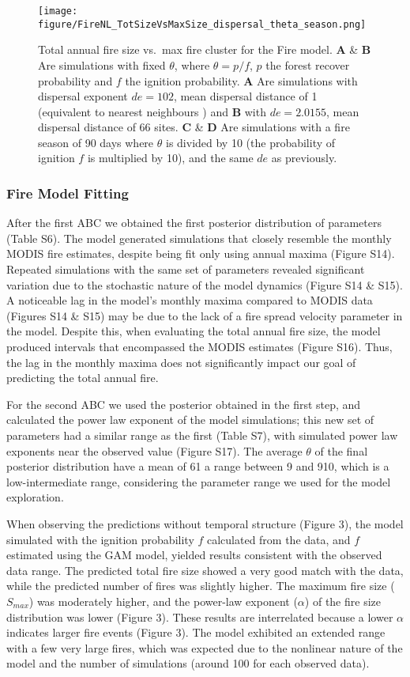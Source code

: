 \documentclass[
]{article}
\begin{document}
\begin{figure}
\centering
\texttt{[image: figure/FireNL\_TotSizeVsMaxSize\_dispersal\_theta\_season.png]}
\caption{Total annual fire size vs.~max fire cluster for the Fire model.
\textbf{A} \& \textbf{B} Are simulations with fixed \(\theta\), where
\(\theta = p/f\), \(p\) the forest recover probability and \(f\) the
ignition probability. \textbf{A} Are simulations with dispersal exponent
\(de=102\), mean dispersal distance of 1 (equivalent to nearest
neighbours ) and \textbf{B} with \(de=2.0155\), mean dispersal distance
of 66 sites. \textbf{C} \& \textbf{D} Are simulations with a fire season
of 90 days where \(\theta\) is divided by 10 (the probability of
ignition \(f\) is multiplied by 10), and the same \(de\) as previously.}
\end{figure}

\subsubsection{Fire Model Fitting}\label{fire-model-fitting-1}

After the first ABC we obtained the first posterior distribution of
parameters (Table S6). The model generated simulations that closely
resemble the monthly MODIS fire estimates, despite being fit only using
annual maxima (Figure S14). Repeated simulations with the same set of
parameters revealed significant variation due to the stochastic nature
of the model dynamics (Figure S14 \& S15). A noticeable lag in the
model's monthly maxima compared to MODIS data (Figures S14 \& S15) may
be due to the lack of a fire spread velocity parameter in the model.
Despite this, when evaluating the total annual fire size, the model
produced intervals that encompassed the MODIS estimates (Figure S16).
Thus, the lag in the monthly maxima does not significantly impact our
goal of predicting the total annual fire.

For the second ABC we used the posterior obtained in the first step, and
calculated the power law exponent of the model simulations; this new set
of parameters had a similar range as the first (Table S7), with
simulated power law exponents near the observed value (Figure S17). The
average \(\theta\) of the final posterior distribution have a mean of 61
a range between 9 and 910, which is a low-intermediate range,
considering the parameter range we used for the model exploration.

When observing the predictions without temporal structure (Figure 3),
the model simulated with the ignition probability \(f\) calculated from
the data, and \(f\) estimated using the GAM model, yielded results
consistent with the observed data range. The predicted total fire size
showed a very good match with the data, while the predicted number of
fires was slightly higher. The maximum fire size (\(S_{max}\)) was
moderately higher, and the power-law exponent (\(\alpha\)) of the fire
size distribution was lower (Figure 3). These results are interrelated
because a lower \(\alpha\) indicates larger fire events (Figure 3). The
model exhibited an extended range with a few very large fires, which was
expected due to the nonlinear nature of the model and the number of
simulations (around 100 for each observed data).
\end{document}
